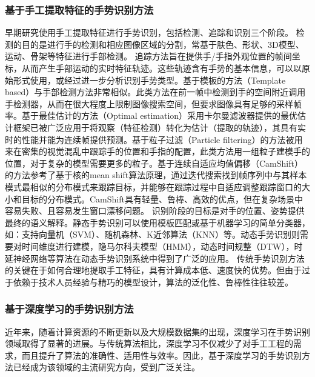 \subsubsection{基于手工提取特征的手势识别方法}
早期研究使用手工提取特征进行手势识别，包括检测、追踪和识别三个阶段\cite{rautaray2015vision}。
检测的目的是进行手的检测和相应图像区域的分割，常基于肤色\cite{sigal2004skin}、形状\cite{chen2007real}、3D模型\cite{tekin2019h+}、运动\cite{pun2011real}、骨架\cite{jiang2021chal21}等特征进行手部检测。
追踪方法旨在提供手/手指外观位置的帧间坐标，从而产生手部运动的实时特征轨迹。这些轨迹含有手势的基本信息，可以以原始形式使用，或经过进一步分析识别手势类型。基于模板的方法（Template based）\cite{crowley1995finger}与手部检测方法非常相似。此类方法在前一帧中检测到手的空间附近调用手检测器，从而在很大程度上限制图像搜索空间，但要求图像具有足够的采样帧率。基于最佳估计的方法（Optimal estimation）\cite{argyros2004real}采用卡尔曼滤波器\cite{kalman1960new}提供的最优估计框架已被广泛应用于将观察（特征检测）转化为估计（提取的轨迹），其具有实时的性能并能为连续帧提供预测。基于粒子过滤（Particle filtering）的方法\cite{perez2002color}被用来在密集的视觉混乱中跟踪手的位置和手指的配置，此类方法用一组粒子建模手的位置，对于复杂的模型需要更多的粒子。基于连续自适应均值偏移（CamShift）的方法\cite{wang2010study}参考了基于核的mean shift算法原理，通过迭代搜索找到帧序列中与其样本模式最相似的分布模式来跟踪目标，并能够在跟踪过程中自适应调整跟踪窗口的大小和目标的分布模式。CamShift具有轻量、鲁棒、高效的优点，但在复杂场景中容易失败、且容易发生窗口漂移问题。
识别阶段的目标是对手的位置、姿势提供最终的语义解释。静态手势识别可以使用模板匹配或基于机器学习的简单分类器\cite{基于视觉的动态手势识别研究综述}，如：支持向量机（SVM）\cite{burges1998tutorial}、随机森林\cite{基于视觉的动态手势识别研究综述}、K近邻算法（KNN）\cite{thirumuruganathan2010knn}等。动态手势识别则需要对时间维度进行建模，隐马尔科夫模型（HMM）\cite{liang1996sign}，动态时间规整（DTW）\cite{corradini2001dynamic}，时延神经网络\cite{sigal2004skin}等算法在动态手势识别系统中得到了广泛的应用。
传统手势识别方法的关键在于如何合理地提取手工特征，具有计算成本低、速度快的优势。但由于过于依赖于技术人员经验与精巧的模型设计，算法的泛化性、鲁棒性往往较差。

\subsubsection{基于深度学习的手势识别方法} %
近年来，随着计算资源的不断更新以及大规模数据集的出现，深度学习在手势识别领域取得了显著的进展。与传统算法相比，深度学习不仅减少了对手工工程的需求，而且提升了算法的准确性、适用性与效率。因此，基于深度学习的手势识别方法已经成为该领域的主流研究方向，受到广泛关注。

